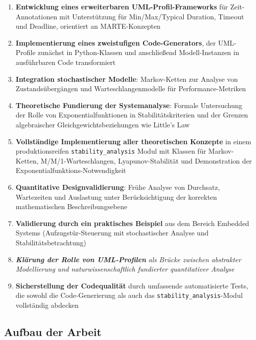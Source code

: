 ﻿\documentclass[a4paper,12pt]{scrreprt}
\theoremstyle{definition}
\begin{document}
\begin{enumerate}
	\item[-] \textbf{Entwicklung eines erweiterbaren UML-Profil-Frameworks} für Zeit-Anno\-tationen mit Unterstützung für Min/Max/Typical Duration, Timeout und Deadline, orientiert an MARTE-Konzepten
	
	\item[-] \textbf{Implementierung eines zweistufigen Code-Generators}, der UML-Profile zu\-nächst in Python-Klassen und anschließend Modell-Instanzen in ausführbaren Code transformiert
	
	\item[-] \textbf{Integration stochastischer Modelle}: Markov-Ketten zur Analyse von Zustands\-übergängen und Warteschlangenmodelle für Performance-Metriken
	
	\item[-] \textbf{Theoretische Fundierung der Systemanalyse}: Formale Untersuchung der Rolle von Exponentialfunktionen in Stabilitätskriterien und der Grenzen algebraischer Gleichgewichtsbeziehungen wie Little's Law
	
	\item[-] \textbf{Vollständige Implementierung aller theoretischen Konzepte} in einem produktionsreifen \texttt{stability\_analysis} Modul mit Klassen für Markov-Ketten, M/M/1-Warteschlangen, Lyapunov-Stabilität und Demonstration der Exponentialfunktions-Notwendigkeit
	
	\item[-] \textbf{Quantitative Designvalidierung}: Frühe Analyse von Durchsatz, Wartezeiten und Auslastung unter Berücksichtigung der korrekten mathematischen Beschreibungsebene
	
	\item[-] \textbf{Validierung durch ein praktisches Beispiel} aus dem Bereich Embedded Systems (Aufzugstür-Steuerung mit stochastischer Analyse und Stabilitätsbetrachtung)
	
	\item[-] \textit{\textbf{Klärung der Rolle von UML-Profilen} als Brücke zwischen abstrakter Modellierung und naturwissenschaftlich fundierter quantitativer Analyse}
	
    \item[-] \textbf{Sicherstellung der Codequalität} durch umfassende
	automatisierte Tests, die sowohl die Code-Generierung als auch
	das \texttt{stability\_analysis}-Modul vollständig abdecken
\end{enumerate}

\subsection{Aufbau der Arbeit}
\end{document}
